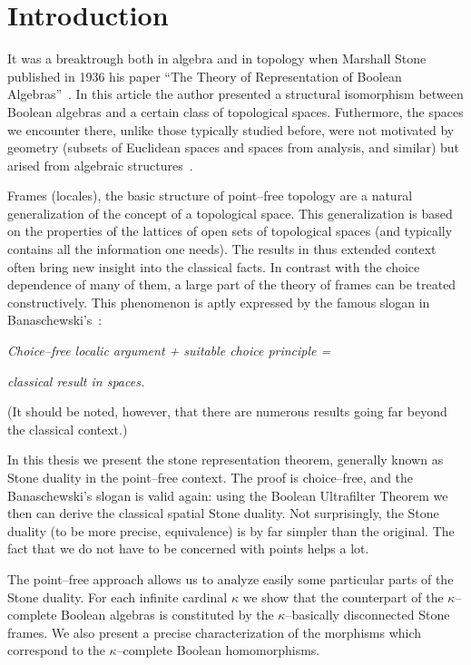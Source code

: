 \chapter{Introduction}

It was a breaktrough both in algebra and in topology when Marshall Stone published in 1936 his paper ``The Theory of Representation of Boolean Algebras''~\cite{stone1936theory}. In this article the author presented a structural isomorphism
between Boolean algebras and a certain class of topological spaces. Futhermore, the spaces we encounter there,
unlike those typically studied before, were not motivated by geometry (subsets of Euclidean spaces and spaces
from analysis, and similar) but arised from algebraic structures~\cite{johnstone1986stone}.

Frames (locales), the basic structure of point--free topology are a natural generalization of  the concept of a topological space. This generalization is based on the properties of the lattices of open sets of topological
spaces (and typically contains all the information one needs). The results in thus extended context often bring new insight into the classical facts. In contrast with the choice dependence of many of them, a large part of the theory of frames can be treated constructively. This phenomenon is aptly expressed by the famous slogan
in Banaschewski's~\cite{banaschewski1990proving}:

\smallskip

\centerline{\em Choice--free localic argument + suitable choice principle = }

\centerline{\em  classical result in spaces.}

\smallskip

\noindent (It should be noted, however, that there are numerous results going far beyond the classical context.)

\medskip

In this thesis we present the stone representation theorem, generally known as Stone duality in the point--free context.
The proof is choice--free, and the Banaschewski's slogan is valid again: using the Boolean Ultrafilter Theorem we then can derive the classical spatial Stone duality. Not surprisingly, the Stone duality (to be more precise, equivalence)
is by far simpler than the original. The fact that we do not have to be concerned with points helps a lot.

\medskip

The point--free approach allows us to analyze easily some particular parts of the Stone duality. For each infinite cardinal $\kappa$ we show that the counterpart of the $\kappa$--complete Boolean algebras is constituted by the $\kappa$--basically disconnected Stone frames. We also present a precise characterization of the morphisms which correspond to the $\kappa$--complete Boolean homomorphisms.

